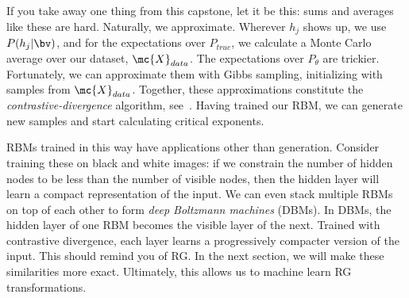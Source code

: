 If you take away one thing from this capstone, let it be this: sums
and averages like these are hard. Naturally, we approximate. Wherever
$h_j$ shows up, we use $P(h_j|\bv)$, and for the expectations over
$P_{true}$, we calculate a Monte Carlo average over our dataset,
$\mc{X}_{data}$. The expectations over $P_\theta$ are trickier. Fortunately,
we can approximate them with Gibbs sampling, initializing with samples
from $\mc{X}_{data}$. Together, these approximations constitute the
\textit{contrastive-divergence} algorithm, see~\cite{hinton}. Having trained our RBM, we
can generate new samples and start calculating critical exponents.

RBMs trained in this way have applications other than generation.
Consider training these on black and white images: if we constrain the
number of hidden nodes to be less than the number of visible nodes,
then the hidden layer will learn a compact representation of the
input. We can even stack multiple RBMs on top of each other to form
\textit{deep Boltzmann machines} (DBMs). In DBMs, the hidden layer of
one RBM becomes the visible layer of the next. Trained with
contrastive divergence, each layer learns a progressively compacter
version of the input.  This should remind you of RG\@. In the next
section, we will make these similarities more exact. Ultimately, this
allows us to machine learn RG transformations.

